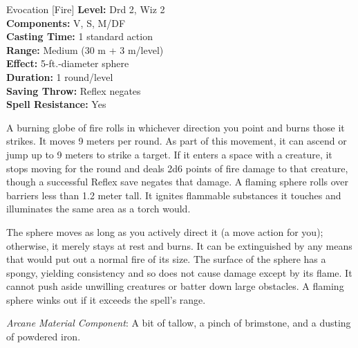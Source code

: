 {Evocation [Fire]}
{
	\textbf{Level:}
	Drd 2, Wiz 2\\
	\textbf{Components:}
	V, S, M/DF\\
	\textbf{Casting Time:}
	1 standard action\\
	\textbf{Range:}
	Medium (30 m + 3 m/level)\\
	\textbf{Effect:}
	5-ft.-diameter sphere\\
	\textbf{Duration:}
	1 round/level\\
	\textbf{Saving Throw:}
	Reflex negates\\
	\textbf{Spell Resistance:}
	Yes\\
}
{
	A burning globe of fire rolls in whichever direction you point and burns those it strikes. It moves 9 meters per round. As part of this movement, it can ascend or jump up to 9 meters to strike a target. If it enters a space with a creature, it stops moving for the round and deals 2d6 points of fire damage to that creature, though a successful Reflex save negates that damage. A flaming sphere rolls over barriers less than 1.2 meter tall. It ignites flammable substances it touches and illuminates the same area as a torch would.

	The sphere moves as long as you actively direct it (a move action for you); otherwise, it merely stays at rest and burns. It can be extinguished by any means that would put out a normal fire of its size. The surface of the sphere has a spongy, yielding consistency and so does not cause damage except by its flame. It cannot push aside unwilling creatures or batter down large obstacles. A flaming sphere winks out if it exceeds the spell's range.

	\textit{Arcane Material Component}:
	A bit of tallow, a pinch of brimstone, and a dusting of powdered iron.

}
